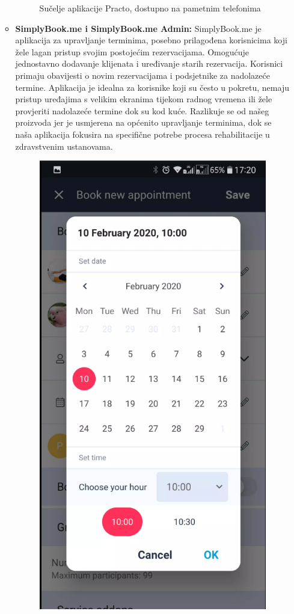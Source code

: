 \begin{itemize}
\begin{itemize}
\begin{figure}[!h]
                            \caption{Sučelje aplikacije Practo, dostupno na pametnim telefonima}
                        \end{figure}
                        \FloatBarrier
                        \item \textbf{SimplyBook.me i SimplyBook.me Admin:} SimplyBook.me je aplikacija za upravljanje terminima, posebno prilagođena korisnicima koji žele lagan pristup svojim postojećim rezervacijama. Omogućuje jednostavno dodavanje klijenata i uređivanje starih rezervacija. Korisnici primaju obavijesti o novim rezervacijama i podsjetnike za nadolazeće termine. Aplikacija je idealna za korisnike koji su često u pokretu, nemaju pristup uređajima s velikim ekranima tijekom radnog vremena ili žele provjeriti nadolazeće termine dok su kod kuće. Razlikuje se od našeg proizvoda jer je usmjerena na općenito upravljanje terminima, dok se naša aplikacija fokusira na specifične potrebe procesa rehabilitacije u zdravstvenim ustanovama.
                        \FloatBarrier
                        \begin{figure}[!h]
                            \centering
                            \includegraphics[width=0.45\linewidth]{slike/simplybook-client.png}

\end{figure}
\end{itemize}
\end{itemize}
